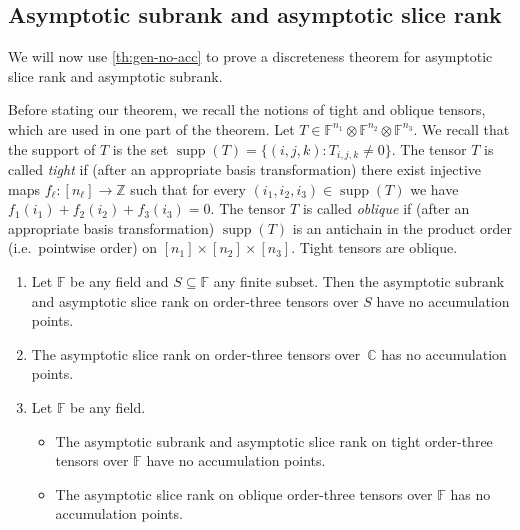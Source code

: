 \documentclass{daj}
\DeclareMathOperator{\supp}{supp}
\newcommand{\FF}{\mathbb{F}}
\newcommand{\CC}{\mathbb{C}}
\newcommand{\ZZ}{\mathbb{Z}}
\begin{document}
%

\subsection{Asymptotic subrank and asymptotic slice rank}

We will now use \autoref{th:gen-no-acc} to prove a discreteness theorem for asymptotic slice rank and asymptotic subrank. 

Before stating our theorem, we recall the notions of tight and oblique tensors, which are used in one part of the theorem. 
Let $T \in \FF^{n_1} \otimes \FF^{n_2} \otimes \FF^{n_3}$.
We recall that the support of $T$ is the set $\supp(T) = \{(i,j,k) : T_{i,j,k} \neq 0\}$.
%
The tensor $T$ is called \emph{tight} if (after an appropriate basis transformation) there exist injective maps $f_\ell : [n_\ell] \to \ZZ$ such that for every $(i_1,i_2,i_3) \in \supp(T)$ we have $f_1(i_1) + f_2(i_2) + f_3(i_3) = 0$. 
%
%
The tensor $T$ is called \emph{oblique} if (after an appropriate basis transformation) $\supp(T)$ is an antichain in the product order (i.e.~pointwise order) on $[n_1] \times [n_2] \times [n_3]$. Tight tensors are oblique.

\begin{theorem}
\label{th:no-acc}
\hfill
\begin{enumerate}[\upshape(i)]
\item Let $\mathbb{F}$ be any field and $S \subseteq \FF$ any finite subset. 
Then the asymptotic subrank and asymptotic slice rank on order-three tensors over $S$ have no accumulation points.
\item %
The asymptotic slice rank on order-three tensors over~$\CC$ has no accumulation points.
\item Let $\mathbb{F}$ be any field.
\begin{itemize}
\item The asymptotic subrank and asymptotic slice rank on tight order-three tensors over $\mathbb{F}$ have no accumulation points.
\item The asymptotic slice rank on oblique order-three tensors over $\mathbb{F}$ has no accumulation points.
\end{itemize}
\end{enumerate}
\end{theorem}
\end{document}
